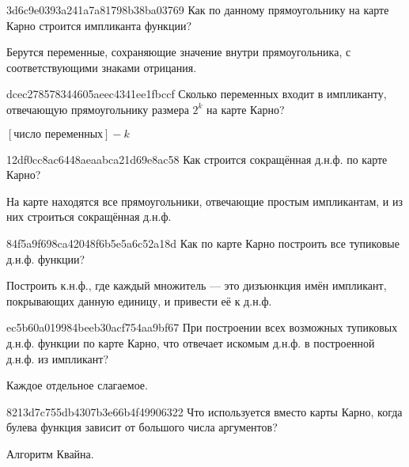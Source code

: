 \begin{note}{3d6c9e0393a241a7a81798b38ba03769}
    Как по данному прямоугольнику на карте Карно строится импликанта функции?

    \begin{cloze}{1}
        Берутся переменные, сохраняющие значение внутри прямоугольника, с соответствующими знаками отрицания.
    \end{cloze}
\end{note}

\begin{note}{dcec278578344605aeec4341ee1fbccf}
    Сколько переменных входит в импликанту, отвечающую прямоугольнику размера \({ 2^{k} }\) на карте Карно?

    \begin{cloze}{1}
        \({ [\text{число переменных}] - k }\)
    \end{cloze}
\end{note}

\begin{note}{12df0cc8ac6448aeaabca21d69e8ac58}
    Как строится сокращённая д.н.ф. по карте Карно?

    \begin{cloze}{1}
        На карте находятся все прямоугольники, отвечающие простым импликантам, и из них строиться сокращённая д.н.ф.
    \end{cloze}
\end{note}

\begin{note}{84f5a9f698ca42048f6b5e5a6c52a18d}
    Как по карте Карно построить все тупиковые д.н.ф. функции?

    \begin{cloze}{1}
        Построить к.н.ф., где каждый множитель --- это дизъюнкция имён импликант, покрывающих данную единицу, и привести её к д.н.ф.
    \end{cloze}
\end{note}

\begin{note}{ec5b60a019984beeb30acf754aa9bf67}
    При построении всех возможных тупиковых д.н.ф. функции по карте Карно, что отвечает искомым д.н.ф. в построенной д.н.ф. из импликант?

    \begin{cloze}{1}
        Каждое отдельное слагаемое.
    \end{cloze}
\end{note}

\begin{note}{8213d7c755db4307b3e66b4f49906322}
    Что используется вместо карты Карно, когда булева функция зависит от большого числа аргументов?

    \begin{cloze}{1}
        Алгоритм Квайна.
    \end{cloze}
\end{note}

